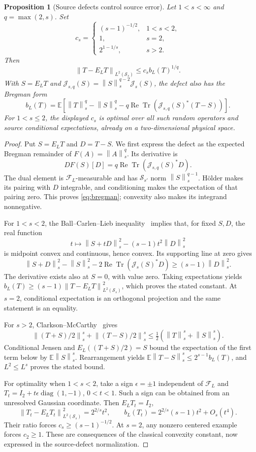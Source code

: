 \documentclass[11pt,a4paper]{amsart}
\numberwithin{equation}{section}
\newtheorem{proposition}[theorem]{Proposition}
\theoremstyle{definition}
\theoremstyle{remark}
\newcommand{\E}{\mathbb E}
\newcommand{\Sch}{\mathcal S}
\DeclareMathOperator{\Tr}{Tr}
\DeclareMathOperator{\diag}{diag}
\newcommand{\norm}[1]{\left\lVert#1\right\rVert}
\newcommand{\Jdu}{\mathscr J_s}
\begin{document}
\begin{proposition}[Source defects control source error]\label{prop:sourcebound}
Let $1<s<\infty$ and $q=\max(2,s)$. Set
\[
 c_s=\begin{cases}(s-1)^{-1/2},&1<s<2,\\1,&s=2,\\2^{1-1/s},&s>2.\end{cases}
\]
Then
\begin{equation}\label{eq:sourceerror}
 \norm{T-E_LT}_{L^2(\Sch_s)}\le c_s b_L(T)^{1/q}.
\end{equation}
With $S=E_LT$ and $\mathscr J_{s,q}(S)=\norm S_s^{q-2}\Jdu(S)$, the defect also has the Bregman form
\begin{equation}\label{eq:bregman}
 b_L(T)=\E\left[\norm T_s^q-\norm S_s^q
 -q\operatorname{Re}\Tr(\mathscr J_{s,q}(S)^*(T-S))\right].
\end{equation}
For $1<s\le2$, the displayed $c_s$ is optimal over all such random operators and source conditional expectations, already on a two-dimensional physical space.
\end{proposition}
\begin{proof}
Put $S=E_LT$ and $D=T-S$. We first express the defect as the expected Bregman remainder of $F(A)=\norm A_s^q$. Its derivative is
\[
 DF(S)[D]=q\operatorname{Re}\Tr(\mathscr J_{s,q}(S)^*D).
\]
The dual element is $\mathcal F_L$-measurable and has $\Sch_{s'}$ norm $\norm S_s^{q-1}$. H\"older makes its pairing with $D$ integrable, and conditioning makes the expectation of that pairing zero. This proves \eqref{eq:bregman}; convexity also makes its integrand nonnegative.

For $1<s<2$, the Ball--Carlen--Lieb inequality~\cite{BCL,RX} implies that, for fixed $S,D$, the real function
\[
 t\longmapsto\norm{S+tD}_s^2-(s-1)t^2\norm D_s^2
\]
is midpoint convex and continuous, hence convex. Its supporting line at zero gives
\[
 \norm{S+D}_s^2-\norm S_s^2
 -2\operatorname{Re}\Tr(\Jdu(S)^*D)
 \ge(s-1)\norm D_s^2.
\]
The derivative exists also at $S=0$, with value zero. Taking expectations yields
$b_L(T)\ge(s-1)\norm{T-E_LT}_{L^2(\Sch_s)}^2$,
which proves the stated constant. At $s=2$, conditional expectation is an orthogonal projection and the same statement is an equality.

For $s>2$, Clarkson--McCarthy~\cite{FK} gives
\[
 \norm{(T+S)/2}_s^s+\norm{(T-S)/2}_s^s
 \le\tfrac12(\norm T_s^s+\norm S_s^s).
\]
Conditional Jensen and $E_L((T+S)/2)=S$ bound the expectation of the first term below by $\E\norm S_s^s$. Rearrangement yields
$\E\norm{T-S}_s^s\le2^{s-1}b_L(T)$,
and $L^2\le L^s$ proves the stated bound.

For optimality when $1<s<2$, take a sign $\epsilon=\pm1$ independent of $\mathcal F_L$ and
$T_t=I_2+t\epsilon\diag(1,-1)$, $0<t<1$. Such a sign can be obtained from an unresolved Gaussian coordinate. Then $E_LT_t=I_2$,
\[
 \norm{T_t-E_LT_t}_{L^2(\Sch_s)}^2=2^{2/s}t^2,
 \qquad
 b_L(T_t)=2^{2/s}(s-1)t^2+O_s(t^4).
\]
Their ratio forces $c_s\ge(s-1)^{-1/2}$. At $s=2$, any nonzero centered example forces $c_2\ge1$. These are consequences of the classical convexity constant, now expressed in the source-defect normalization.
\end{proof}
\end{document}
